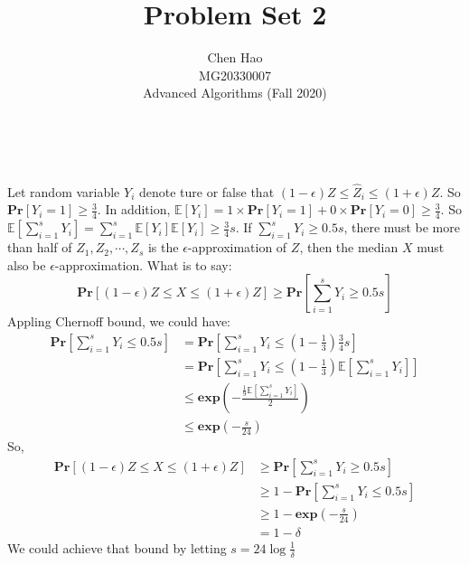 \documentclass[12pt]{article}
\newenvironment{solution}[2][Solution]{\begin{trivlist}
\item[\hskip \labelsep {\bfseries #1}\hskip \labelsep {\bfseries #2.}]}{\end{trivlist}}
\begin{document}

\title{Problem Set 2}%
\author{Chen Hao \\ MG20330007\\ %
    Advanced Algorithms (Fall 2020)} %

\maketitle

\begin{solution}{1}
    ~

    Let random variable $Y_i$ denote ture or false that $(1-\epsilon)Z \le \hat{Z}_i \le (1+\epsilon)Z$.
    So $\mathbf{Pr}[Y_i = 1] \ge \frac34$. In addition, $\mathbb{E}[Y_i] = 1 \times  \mathbf{Pr}[Y_i = 1] + 0 \times \mathbf{Pr}[Y_i = 0] \ge \frac34$.
    So $\mathbb{E}[\sum_{i=1}^{s}Y_i] = \sum_{i=1}^{s}\mathbb{E}[Y_i]\mathbb{E}[Y_i] \ge \frac34s$.
    If $\sum_{i=1}^{s}Y_i \ge 0.5s$, there must be more than half of $Z_1,Z_2,\cdots,Z_s$ is the $\epsilon$-approximation
    of $Z$, then the median $X$ must also be $\epsilon$-approximation. What is to say:
    \[\mathbf{Pr}[(1-\epsilon)Z \le X \le (1+\epsilon)Z] \ge \mathbf{Pr}[\sum_{i=1}^{s}Y_i \ge 0.5s]\]
    Appling Chernoff bound, we could have:
    \begin{align*}
        \mathbf{Pr}[\sum_{i=1}^{s}Y_i \le 0.5s] & = \mathbf{Pr}[\sum_{i=1}^{s}Y_i \le (1-\frac13)\frac34s]                      \\
                                                & = \mathbf{Pr}[\sum_{i=1}^{s}Y_i \le (1-\frac13)\mathbb{E}[\sum_{i=1}^{s}Y_i]] \\
                                                & \le \mathbf{exp}(-\frac{\frac19\mathbb{E}[\sum_{i=1}^{s}Y_i]}2)               \\
                                                & \le \mathbf{exp}(-\frac{s}{24})
    \end{align*}
    So,
    \begin{align*}
        \mathbf{Pr}[(1-\epsilon)Z \le X \le (1+\epsilon)Z] & \ge \mathbf{Pr}[\sum_{i=1}^{s}Y_i \ge 0.5s]   \\
                                                           & \ge 1-\mathbf{Pr}[\sum_{i=1}^{s}Y_i \le 0.5s] \\
                                                           & \ge 1 - \mathbf{exp}(-\frac{s}{24})           \\
                                                           & =1-\delta
    \end{align*}
    We could achieve that bound by letting $s=24\log \frac1\delta$
\end{solution}
\end{document}
